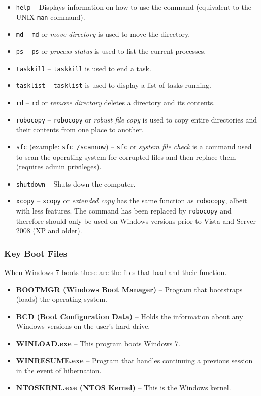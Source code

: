 \documentclass{article}
\begin{document}
\begin{itemize}
\item \texttt{help} -- Displays information on how to use the command (equivalent to the UNIX \texttt{man} command).
\item \texttt{md} -- \texttt{md} or \textit{move directory} is used to move the directory.
\item \texttt{ps} -- \texttt{ps} or  \textit{process status} is used to list the current processes.
\item \texttt{taskkill} -- \texttt{taskkill} is used to end a task.
\item \texttt{tasklist} -- \texttt{tasklist} is used to display a list of tasks running.
\item \texttt{rd} -- \texttt{rd} or \textit{remove directory} deletes a directory and its contents.
\item \texttt{robocopy} -- \texttt{robocopy} or \textit{robust file copy} is used to copy entire directories and their contents from one place to another.
\item \texttt{sfc} (example: \texttt{sfc /scannow}) -- \texttt{sfc} or \textit{system file check} is a command used to scan the operating system for corrupted files and then replace them (requires admin privileges).
\item \texttt{shutdown} -- Shuts down the computer.
\item \texttt{xcopy} -- \texttt{xcopy} or \textit{extended copy} has the same function as \texttt{robocopy}, albeit with less features. The command has been replaced by \texttt{robocopy} and therefore should only be used on Windows versions prior to Vista and Server 2008 (XP and older).
\end{itemize}

\subsubsection{Key Boot Files}

When Windows 7 boots these are the files that load and their function.

\begin{itemize}
    \item \textbf{BOOTMGR (Windows Boot Manager)} -- Program that bootstraps (loads) the operating system.
    \item \textbf{BCD (Boot Configuration Data)} -- Holds the information about any Windows versions on the user's hard drive.
    \item \textbf{WINLOAD.exe} -- This program boots Windows 7.
    \item \textbf{WINRESUME.exe} -- Program that handles continuing a previous session in the event of hibernation.
    \item \textbf{NTOSKRNL.exe (NTOS Kernel)} -- This is the Windows kernel. 
\end{itemize}
\end{document}
